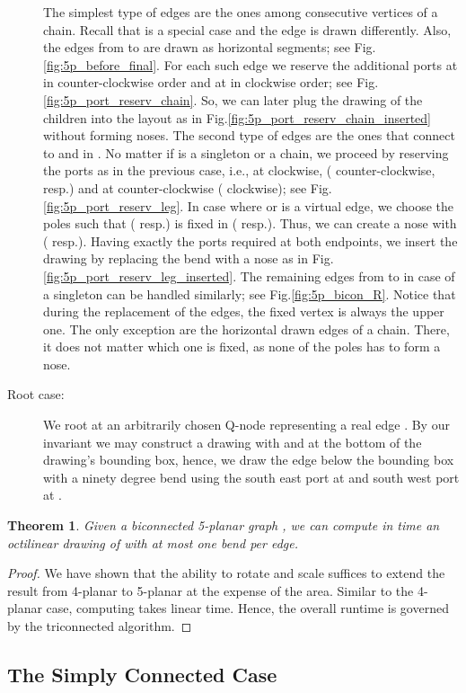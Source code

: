 \documentclass[a4paper,twoside,11pt]{article}
\newtheorem{theorem}{Theorem}
\begin{document}
\begin{description}
The simplest type of edges are the ones among consecutive vertices
 of a chain. Recall that  is a
special case and the edge  is drawn differently. Also,
the edges from  to  are drawn as horizontal segments; see
Fig.\ref{fig:5p_before_final}. For each such edge we reserve the
additional ports at  in counter-clockwise order and at
 in clockwise order; see
Fig.\ref{fig:5p_port_reserv_chain}. So, we can later plug the
drawing of the children into the layout as in
Fig.\ref{fig:5p_port_reserv_chain_inserted} without forming noses.
The second type of edges are the ones that connect  to   and  in
. No matter if  is a singleton or a chain, we proceed
by reserving the ports as in the previous case, i.e., at 
clockwise, ( counter-clockwise, resp.) and at 
counter-clockwise ( clockwise); see
Fig.\ref{fig:5p_port_reserv_leg}. In case where  or
 is a virtual edge, we choose the poles such that
 ( resp.) is fixed in  ( resp.). Thus, we can create a nose with  (
resp.). Having exactly the ports required at both endpoints, we
insert the drawing by replacing the bend with a nose as in
Fig.\ref{fig:5p_port_reserv_leg_inserted}. The remaining edges from
 to  in case of a singleton  can be
handled similarly; see Fig.\ref{fig:5p_bicon_R}. Notice that during
the replacement of the edges, the fixed vertex is always the upper
one. The only exception are the horizontal drawn edges of a chain.
There, it does not matter which one is fixed, as none of the poles
has to form a nose.
\item[Root case:] We root  at an arbitrarily chosen
Q-node representing a real edge . By our invariant we may
construct a drawing with  and  at the bottom of the drawing's
bounding box, hence, we draw the edge  below the bounding box
with a ninety degree bend using the south east port at  and south
west port at .
\end{description}

\begin{theorem}
Given a biconnected 5-planar graph , we can compute in 
time an octilinear drawing of  with at most one bend per edge.
\end{theorem}
\begin{proof}
We have shown that the ability to rotate and scale suffices to
extend the result from 4-planar to 5-planar at the expense of the
area. Similar to the 4-planar case, computing  takes
linear time. Hence, the overall runtime is governed by the
triconnected algorithm.
\end{proof}

\subsection{The Simply Connected Case}
\end{document}
